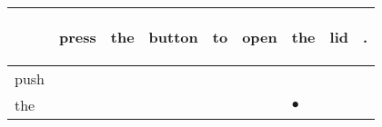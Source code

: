 \documentclass[landscape]{article}
\newcommand{\ssp}{\hspace{2pt}}
\newcommand{\mex}{\cellcolor{g}$\bullet$}
\begin{document}
\noindent\begin{tabular}{|l|p{10pt}|p{10pt}|p{10pt}|p{10pt}|p{10pt}|p{10pt}|p{10pt}|p{10pt}|}
\hline
&\begin{sideways}\cellcolor{ref0}press\hspace{12pt}\end{sideways}&\begin{sideways}\cellcolor{ref1}the\hspace{12pt}\end{sideways}&\begin{sideways}\cellcolor{ref2}button\hspace{12pt}\end{sideways}&\begin{sideways}\cellcolor{ref3}to\hspace{12pt}\end{sideways}&\begin{sideways}\cellcolor{ref4}open\hspace{12pt}\end{sideways}&\begin{sideways}\cellcolor{ref5}the\hspace{12pt}\end{sideways}&\begin{sideways}\cellcolor{ref6}lid\hspace{12pt}\end{sideways}&\begin{sideways}\cellcolor{ref7}.\hspace{12pt}\end{sideways}\\
\hline
\ssp push \ssp&\hspace{2pt}&\hspace{2pt}&\hspace{2pt}&\hspace{2pt}&\hspace{2pt}&\hspace{2pt}&\hspace{2pt}&\hspace{2pt}\\
\hline
\ssp \cellcolor{ref5}the \ssp&\hspace{2pt}&\hspace{2pt}&\hspace{2pt}&\hspace{2pt}&\hspace{2pt}&\hspace{2pt}\mex&\hspace{2pt}&\hspace{2pt}\\

\end{tabular}
\end{document}
